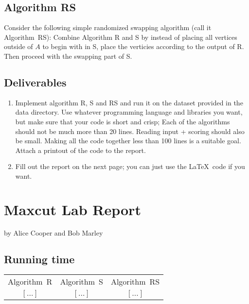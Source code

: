 \documentclass{tufte-handout}
\begin{document}
\subsection{Algorithm RS}
Consider the following simple randomized swapping algorithm (call
it Algorithm~RS): Combine Algorithm R and S by instead of placing
all vertices outside of $A$ to begin with in S, place the verticies according
to the output of R. Then proceed with the swapping part of S.

\subsection{ Deliverables}

\begin{enumerate}
\item Implement algorithm R, S and RS and run it on the dataset provided in
  the data directory.
  Use whatever programming language and libraries you want, but make
  sure that your code is short and crisp; Each of the algorithms should 
  not be much more than 20 lines. Reading input + scoring should also be
  small. Making all the code together less than 100 lines is a suitable goal.
  Attach a printout of the code to the report.
\item Fill out the report on the next page; you can just use the
  \LaTeX\ code if you want.
\end{enumerate}

\newpage


\newpage
\section{Maxcut Lab Report}


by Alice Cooper and Bob Marley

\subsection{Running time}

\begin{tabular}{ c c c }
    Algorithm~R & Algorithm~S & Algorithm~RS \\ 
    $[\ldots]$ & $[\ldots]$ & $[\ldots]$ 
\end{tabular}
\end{document}
